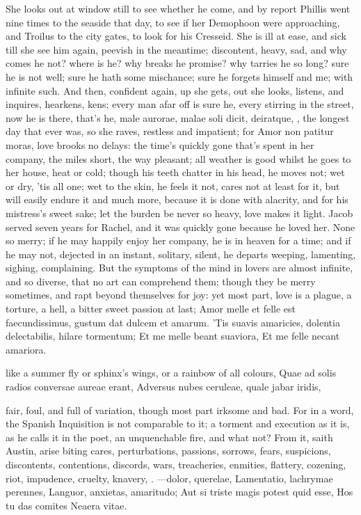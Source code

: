 {She looks out at window still to see whether he come, and by
report Phillis went nine times to the seaside that day, to see if her
Demophoon were approaching, and Troilus to the city gates, to
look for his Cresseid. She is ill at ease, and sick till she see him
again, peevish in the meantime; discontent, heavy, sad, and why comes
he not? where is he? why breaks he promise? why tarries he so long?
sure he is not well; sure he hath some mischance; sure he forgets
himself and me; with infinite such. And then, confident again, up she
gets, out she looks, listens, and inquires, hearkens, kens; every man
afar off is sure he, every stirring in the street, now he is there,
that's he, male aurorae, malae soli dicit, deiratque, \etc{}, the longest
day that ever was, so she raves, restless and impatient; for Amor non
patitur moras, love brooks no delays: the time's quickly gone that's
spent in her company, the miles short, the way pleasant; all weather is
good whilst he goes to her house, heat or cold; though his teeth
chatter in his head, he moves not; wet or dry, 'tis all one; wet to the
skin, he feels it not, cares not at least for it, but will easily
endure it and much more, because it is done with alacrity, and for his
mistress's sweet sake; let the burden be never so heavy, love makes it
light. Jacob served seven years for Rachel, and it was quickly
gone because he loved her. None so merry; if he may happily enjoy her
company, he is in heaven for a time; and if he may not, dejected in an
instant, solitary, silent, he departs weeping, lamenting, sighing,
complaining.
But the symptoms of the mind in lovers are almost infinite, and so
diverse, that no art can comprehend them; though they be merry
sometimes, and rapt beyond themselves for joy: yet most part, love is a
plague, a torture, a hell, a bitter sweet passion at last; Amor
melle et felle est faecundissimus, gustum dat dulcem et amarum. 'Tis
suavis amaricies, dolentia delectabilis, hilare tormentum;
Et me melle beant suaviora,
Et me felle necant amariora.

like a summer fly or sphinx's wings, or a rainbow of all colours,
Quae ad solis radios conversae aureae erant,
Adversus nubes ceruleae, quale jabar iridis,

fair, foul, and full of variation, though most part irksome and bad.
For in a word, the Spanish Inquisition is not comparable to it; a
torment and execution as it is, as he calls it in the poet, an
unquenchable fire, and what not? From it, saith Austin, arise
biting cares, perturbations, passions, sorrows, fears, suspicions,
discontents, contentions, discords, wars, treacheries, enmities,
flattery, cozening, riot, impudence, cruelty, knavery, \etc{}.
---dolor, querelae,
Lamentatio, lachrymae perennes,
Languor, anxietas, amaritudo;
Aut si triste magis potest quid esse,
Hos tu das comites Neaera vitae.

}
